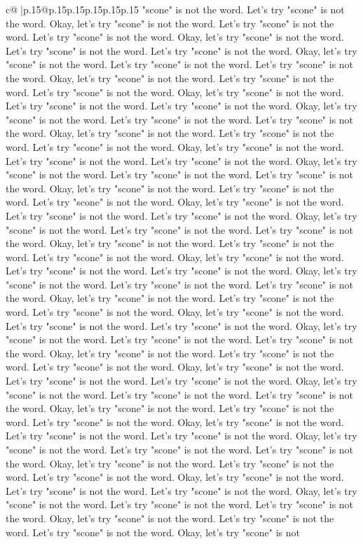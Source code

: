 \documentclass{article}
\begin{document}
{\begin{supertabular}{c@{$\;$}|p{.15\linewidth}@{}p{.15\linewidth}p{.15\linewidth}p{.15\linewidth}p{.15\linewidth}p{.15\linewidth}}
{{{"scone" is not the word. Let's try "scone" is not the word. Okay, let's try "scone" is not the word. Let's try "scone" is not the word. Let's try "scone" is not the word. Okay, let's try "scone" is not the word. Let's try "scone" is not the word. Let's try "scone" is not the word. Okay, let's try "scone" is not the word. Let's try "scone" is not the word. Let's try "scone" is not the word. Okay, let's try "scone" is not the word. Let's try "scone" is not the word. Let's try "scone" is not the word. Okay, let's try "scone" is not the word. Let's try "scone" is not the word. Let's try "scone" is not the word. Okay, let's try "scone" is not the word. Let's try "scone" is not the word. Let's try "scone" is not the word. Okay, let's try "scone" is not the word. Let's try "scone" is not the word. Let's try "scone" is not the word. Okay, let's try "scone" is not the word. Let's try "scone" is not the word. Let's try "scone" is not the word. Okay, let's try "scone" is not the word. Let's try "scone" is not the word. Let's try "scone" is not the word. Okay, let's try "scone" is not the word. Let's try "scone" is not the word. Let's try "scone" is not the word. Okay, let's try "scone" is not the word. Let's try "scone" is not the word. Let's try "scone" is not the word. Okay, let's try "scone" is not the word. Let's try "scone" is not the word. Let's try "scone" is not the word. Okay, let's try "scone" is not the word. Let's try "scone" is not the word. Let's try "scone" is not the word. Okay, let's try "scone" is not the word. Let's try "scone" is not the word. Let's try "scone" is not the word. Okay, let's try "scone" is not the word. Let's try "scone" is not the word. Let's try "scone" is not the word. Okay, let's try "scone" is not the word. Let's try "scone" is not the word. Let's try "scone" is not the word. Okay, let's try "scone" is not the word. Let's try "scone" is not the word. Let's try "scone" is not the word. Okay, let's try "scone" is not the word. Let's try "scone" is not the word. Let's try "scone" is not the word. Okay, let's try "scone" is not the word. Let's try "scone" is not the word. Let's try "scone" is not the word. Okay, let's try "scone" is not the word. Let's try "scone" is not the word. Let's try "scone" is not the word. Okay, let's try "scone" is not the word. Let's try "scone" is not the word. Let's try "scone" is not the word. Okay, let's try "scone" is not the word. Let's try "scone" is not the word. Let's try "scone" is not the word. Okay, let's try "scone" is not the word. Let's try "scone" is not the word. Let's try "scone" is not the word. Okay, let's try "scone" is not the word. Let's try "scone" is not the word. Let's try "scone" is not the word. Okay, let's try "scone" is not the word. Let's try "scone" is not the word. Let's try "scone" is not the word. Okay, let's try "scone" is not the word. Let's try "scone" is not the word. Let's try "scone" is not the word. Okay, let's try "scone" is not the word. Let's try "scone" is not the word. Let's try "scone" is not the word. Okay, let's try "scone" is not the word. Let's try "scone" is not the word. Let's try "scone" is not the word. Okay, let's try "scone" is not }}}
\end{supertabular}}
\end{document}
